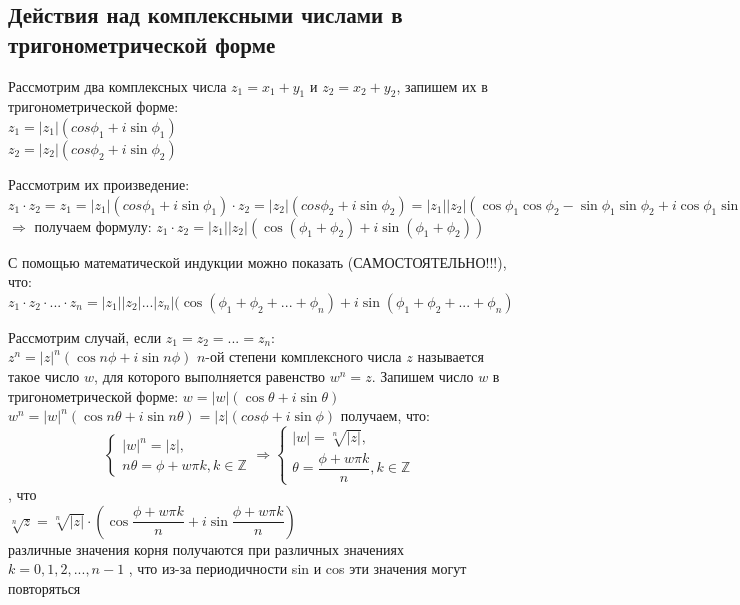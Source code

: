 \documentclass[oneside]{book}
\begin{document}
\begin{itemize}
\begin{enumerate}
\subsection{Действия над комплексными числами в тригонометрической форме}
\par Рассмотрим два комплексных числа $z_1=x_1+y_1$ и $z_2=x_2+y_2$, запишем их в тригонометрической форме:\\ $z_1=|z_1|(cos\phi_1+i\sin\phi_1)$\\
$z_2=|z_2|(cos\phi_2+i\sin\phi_2)$\\
\par Рассмотрим их произведение:\\ $z_1\cdot z_2=z_1=|z_1|(cos\phi_1+i\sin\phi_1)\cdot z_2=|z_2|(cos\phi_2+i\sin\phi_2)=|z_1||z_2|(\cos\phi_1\cos\phi_2-\sin\phi_1\sin\phi_2+i\cos\phi_1\sin\phi_2+i\cos\phi_2\sin\phi_1)=|z_1||z_2|(\cos(\phi_1+\phi_2)+i\sin(\phi_1+\phi_2))$
\\ $\Rightarrow$ получаем формулу: $z_1\cdot z_2=|z_1||z_2|(\cos(\phi_1+\phi_2)+i\sin(\phi_1+\phi_2))$\\
\par С помощью математической индукции можно показать (САМОСТОЯТЕЛЬНО!!!), что:\\ $z_1\cdot z_2\cdot...\cdot z_n=|z_1||z_2|...|z_n|(\cos(\phi_1+\phi_2+...+\phi_n)+i\sin(\phi_1+\phi_2+...+\phi_n)$ 
\par Рассмотрим случай, если $z_1=z_2=...=z_n$:\\
$z^n=|z|^n(\cos n\phi+i\sin n\phi)$
 $n$-ой степени комплексного числа $z$ называется такое число $w$, для которого выполняется равенство $w^n=z$. Запишем число $w$ в тригонометрической форме: $w=|w|(\cos\theta+i\sin\theta)$\\
$w^n=|w|^n(\cos n\theta+i\sin n\theta)=|z|(cos\phi+i\sin\phi)$
 получаем, что:
\begin{equation}
	\begin{cases}
		|w|^n=|z|,\\
		n\theta=\phi+w\pi k, k \in \mathbb{Z}
	\end{cases}
	\Rightarrow
	\begin{cases}
		|w|=\sqrt[n]{|z|},\\
		\theta=\dfrac{\phi+w\pi k}{n}, k \in \mathbb{Z}
	\end{cases}
\end{equation}
, что\\
$\sqrt[n]{z}=\sqrt[n]{|z|}\cdot (\cos\dfrac{\phi+w\pi k}{n}+i\sin\dfrac{\phi+w\pi k}{n})$\\
различные значения корня получаются при различных значениях $k=0, 1, 2, ..., n-1$
, что из-за периодичности sin и cos эти значения могут повторяться

\end{enumerate}
\end{itemize}
\end{document}
